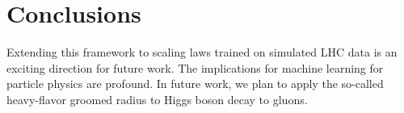 \section{Conclusions}\label{sec:conclusions}

Extending this framework to scaling laws trained on simulated LHC data
is an exciting direction for future work. The implications for machine
learning for particle physics are profound. In future work, we plan to
apply the so-called heavy-flavor groomed radius to Higgs boson decay to
gluons.

